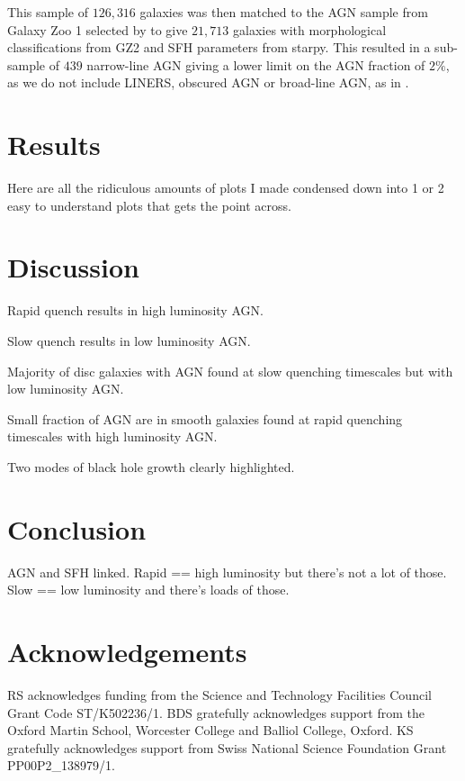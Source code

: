 \documentclass[useAMS,usenatbib]{mn2e}
\begin{document}
This sample of $126, 316$ galaxies was then matched to the AGN sample from Galaxy Zoo 1 selected by \cite{Sch2010} to give $21,713$ galaxies with morphological classifications from GZ2 and SFH parameters from starpy. This resulted in a sub-sample of $439$ narrow-line AGN giving a lower limit on the AGN fraction of $2\%$, as we do not include LINERS, obscured AGN or broad-line AGN, as in \cite{Sch2010}.






\section{Results}

Here are all the ridiculous amounts of plots I made condensed down into 1 or 2 easy to understand plots that gets the point across. 

\section{Discussion}

Rapid quench results in high luminosity AGN. 

Slow quench results in low luminosity AGN. 

Majority of disc galaxies with AGN found at slow quenching timescales but with low luminosity AGN. 

Small fraction of AGN are in smooth galaxies found at rapid quenching timescales with high luminosity AGN. 

Two modes of black hole growth clearly highlighted. 

\section{Conclusion}

AGN and SFH linked. Rapid == high luminosity but there's not a lot of those. Slow == low luminosity and there's loads of those. 

\section*{Acknowledgements}

RS acknowledges funding from the Science and Technology Facilities Council Grant Code ST/K502236/1. BDS gratefully acknowledges support from the Oxford Martin School, Worcester College and Balliol College, Oxford. KS gratefully acknowledges support from Swiss National Science Foundation Grant PP00P2\_138979/1.
\end{document}
